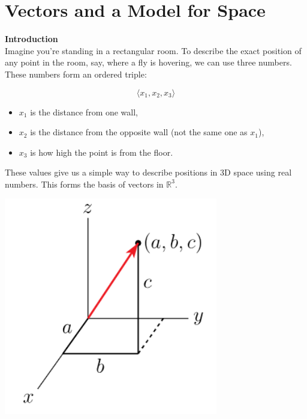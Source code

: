 \documentclass[11pt]{article}
\begin{document}


\section{Vectors and a Model for Space}


\textbf{Introduction}
\\
Imagine you're standing in a rectangular room. To describe the exact position of any point in the room, say, 
where a fly is hovering, we can use three numbers. These numbers form an ordered triple:

\[
\langle x_1, x_2, x_3 \rangle
\]
\begin{itemize}
\item $x_1$ is the distance from one wall,
\item $x_2$ is the distance from the opposite wall (not the same one as $x_1$),
\item $x_3$ is how high the point is from the floor.
\end{itemize}


These values give us a simple way to describe positions in 3D space using real numbers. 
This forms the basis of vectors in $\mathbb{R}^3$.
\begin{center}
  \includegraphics[width=0.7\textwidth]{figures/Vector.png}
\end{center}



\newpage






\end{document}
